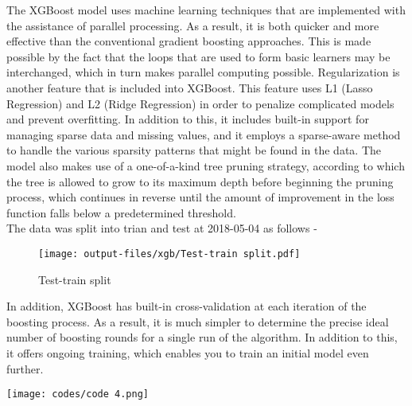 \documentclass[12pt]{article}
\begin{document}
The XGBoost model uses machine learning techniques that are implemented with the assistance of parallel processing. As a result, it is both quicker and more effective than the conventional gradient boosting approaches. This is made possible by the fact that the loops that are used to form basic learners may be interchanged, which in turn makes parallel computing possible. Regularization is another feature that is included into XGBoost. This feature uses L1 (Lasso Regression) and L2 (Ridge Regression) in order to penalize complicated models and prevent overfitting. In addition to this, it includes built-in support for managing sparse data and missing values, and it employs a sparse-aware method to handle the various sparsity patterns that might be found in the data. The model also makes use of a one-of-a-kind tree pruning strategy, according to which the tree is allowed to grow to its maximum depth before beginning the pruning process, which continues in reverse until the amount of improvement in the loss function falls below a predetermined threshold.\\ 
The data was split into trian and test at 2018-05-04 as follows - 
\begin{figure}[H]
    \centering
    \texttt{[image: output-files/xgb/Test-train split.pdf]}
    \caption{Test-train split}
    \label{fig:enter-label}
\end{figure}
In addition, XGBoost has built-in cross-validation at each iteration of the boosting process. As a result, it is much simpler to determine the precise ideal number of boosting rounds for a single run of the algorithm. In addition to this, it offers ongoing training, which enables you to train an initial model even further. 
\begin{center}
    \texttt{[image: codes/code 4.png]}
\end{center}

\end{document}
